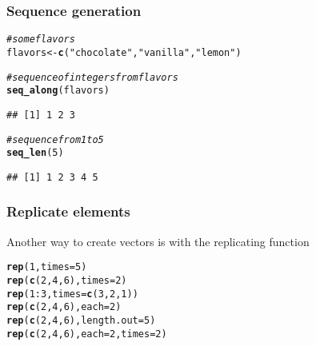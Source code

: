 \documentclass[12pt]{beamer}\usepackage[]{graphicx}\usepackage[]{color}
\makeatletter
\newcommand{\hlnum}[1]{\textcolor[rgb]{0.686,0.059,0.569}{#1}}%
\newcommand{\hlstr}[1]{\textcolor[rgb]{0.192,0.494,0.8}{#1}}%
\newcommand{\hlcom}[1]{\textcolor[rgb]{0.678,0.584,0.686}{\textit{#1}}}%
\newcommand{\hlopt}[1]{\textcolor[rgb]{0,0,0}{#1}}%
\newcommand{\hlstd}[1]{\textcolor[rgb]{0.345,0.345,0.345}{#1}}%
\newcommand{\hlkwb}[1]{\textcolor[rgb]{0.69,0.353,0.396}{#1}}%
\newcommand{\hlkwc}[1]{\textcolor[rgb]{0.333,0.667,0.333}{#1}}%
\newcommand{\hlkwd}[1]{\textcolor[rgb]{0.737,0.353,0.396}{\textbf{#1}}}%
\newenvironment{kframe}{%
 \def\at@end@of@kframe{}%
 \ifinner\ifhmode%
  \def\at@end@of@kframe{\end{minipage}}%
  \begin{minipage}{\columnwidth}%
 \fi\fi%
 \def\FrameCommand##1{\hskip\@totalleftmargin \hskip-\fboxsep
 \colorbox{shadecolor}{##1}\hskip-\fboxsep
     \hskip-\linewidth \hskip-\@totalleftmargin \hskip\columnwidth}%
 \MakeFramed {\advance\hsize-\width
   \@totalleftmargin\z@ \linewidth\hsize
   \@setminipage}}%
 {\par\unskip\endMakeFramed%
 \at@end@of@kframe}
\newenvironment{knitrout}{}{} %
\makeatother
\begin{document}
\begin{frame}[fragile]
\frametitle{Sequence generation}

\begin{knitrout}\footnotesize
{}\color{fgcolor}\begin{kframe}
\begin{alltt}
\hlcom{# some flavors}
\hlstd{flavors} \hlkwb{<-} \hlkwd{c}\hlstd{(}\hlstr{"chocolate"}\hlstd{,} \hlstr{"vanilla"}\hlstd{,} \hlstr{"lemon"}\hlstd{)}

\hlcom{# sequence of integers from flavors}
\hlkwd{seq_along}\hlstd{(flavors)}
\end{alltt}
\begin{verbatim}
## [1] 1 2 3
\end{verbatim}
\begin{alltt}
\hlcom{# sequence from 1 to 5}
\hlkwd{seq_len}\hlstd{(}\hlnum{5}\hlstd{)}
\end{alltt}
\begin{verbatim}
## [1] 1 2 3 4 5
\end{verbatim}
\end{kframe}
\end{knitrout}

\end{frame}


\begin{frame}[fragile]
\frametitle{Replicate elements}

Another way to create vectors is with the replicating function {\hilit {}}
\begin{knitrout}\footnotesize
{}\color{fgcolor}\begin{kframe}
\begin{alltt}
\hlkwd{rep}\hlstd{(}\hlnum{1}\hlstd{,} \hlkwc{times} \hlstd{=} \hlnum{5}\hlstd{)}
\hlkwd{rep}\hlstd{(}\hlkwd{c}\hlstd{(}\hlnum{2}\hlstd{,} \hlnum{4}\hlstd{,} \hlnum{6}\hlstd{),} \hlkwc{times} \hlstd{=} \hlnum{2}\hlstd{)}
\hlkwd{rep}\hlstd{(}\hlnum{1}\hlopt{:}\hlnum{3}\hlstd{,} \hlkwc{times} \hlstd{=} \hlkwd{c}\hlstd{(}\hlnum{3}\hlstd{,} \hlnum{2}\hlstd{,} \hlnum{1}\hlstd{))}
\hlkwd{rep}\hlstd{(}\hlkwd{c}\hlstd{(}\hlnum{2}\hlstd{,} \hlnum{4}\hlstd{,} \hlnum{6}\hlstd{),} \hlkwc{each} \hlstd{=} \hlnum{2}\hlstd{)}
\hlkwd{rep}\hlstd{(}\hlkwd{c}\hlstd{(}\hlnum{2}\hlstd{,} \hlnum{4}\hlstd{,} \hlnum{6}\hlstd{),} \hlkwc{length.out} \hlstd{=} \hlnum{5}\hlstd{)}
\hlkwd{rep}\hlstd{(}\hlkwd{c}\hlstd{(}\hlnum{2}\hlstd{,} \hlnum{4}\hlstd{,} \hlnum{6}\hlstd{),} \hlkwc{each} \hlstd{=} \hlnum{2}\hlstd{,} \hlkwc{times} \hlstd{=} \hlnum{2}\hlstd{)}
\end{alltt}
\end{kframe}
\end{knitrout}

\end{frame}
\end{document}
